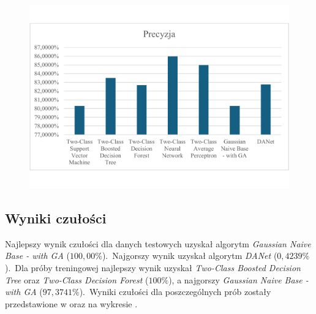 \begin{figure}[H]
    \centering
    \includegraphics[width=\textwidth]{images/prec-res}
    \label{fig:prec-res}
\end{figure}

\subsection{Wyniki czułości}
Najlepszy wynik czułości dla danych testowych uzyskał algorytm \textit{Gaussian Naive Base - with GA} ($100,00\%$).\ Najgorszy wynik uzyskał algorytm \textit{DANet} ($0,4239\%$).\ Dla próby treningowej najlepszy wynik uzyskał \textit{Two-Class Boosted Decision Tree} oraz \textit{Two-Class Decision Forest} ($100\%$), a najgorszy \textit{Gaussian Naive Base - with GA} ($97,3741\%$).\ Wyniki czułości dla poszczególnych prób zostały przedstawione w  oraz na wykresie .

